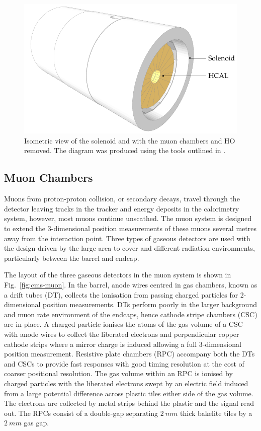 \begin{figure}[htbp]
    \centering
    \includegraphics{diagrams/tikz/cms/annotated/cms_magnet.pdf}
    \caption{
        Isometric view of the solenoid and \HCAL with the muon chambers and
        HO removed. The diagram was produced using the tools outlined in
        \cite{Sakuma:2013jqa}.
    }
    \label{fig:cms-magnet}
\end{figure}


\subsection{Muon Chambers}

Muons from proton-proton collision, or secondary decays, travel through the
detector leaving tracks in the tracker and energy deposits in the calorimetry
system, however, most muons continue unscathed. The muon system is designed to
extend the 3-dimensional position measurements of these muons several metres
away from the interaction point. Three types of gaseous detectors are used
with the design driven by the large area to cover and different radiation
environments, particularly between the barrel and endcap.

The layout of the three gaseous detectors in the \CMS muon system is shown in
{Fig.~\ref{fig:cms-muon}}. In the barrel, anode wires centred in gas chambers,
known as a drift tubes (DT), collects the ionisation from passing charged
particles for 2-dimensional position measurements. DTs perform poorly in the
larger background and muon rate environment of the endcaps, hence cathode
stripe chambers (CSC) are in-place. A charged particle ionises the atoms of
the gas volume of a CSC with anode wires to collect the liberated electrons
and perpendicular copper cathode strips where a mirror charge is induced
allowing a full 3-dimensional position measurement. Resistive plate chambers
(RPC) accompany both the DTs and CSCs to provide fast responses with good
timing resolution at the cost of coarser positional resolution. The gas volume
within an RPC is ionised by charged particles with the liberated electrons
swept by an electric field induced from a large potential difference across
plastic tiles either side of the gas volume. The electrons are collected by
metal strips behind the plastic and the signal read out. The \CMS RPCs consist
of a double-gap separating ${\SI{2}{mm}}$ thick bakelite tiles by a
${\SI{2}{mm}}$ gas gap. 

